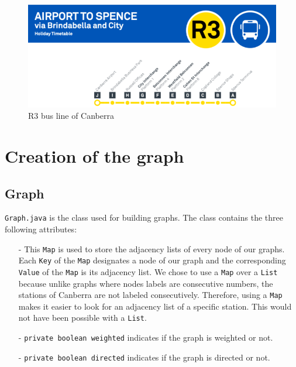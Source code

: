 \documentclass{article}
\begin{document}
\begin{figure}[h]
\begin{center}
	\includegraphics[scale=1]{assets/R3}
\end{center}
\caption{R3 bus line of Canberra}
\end{figure} 

\section{Creation of the graph}

\subsection{Graph}

\texttt{Graph.java} is the class used for building graphs.
The class contains the three following attributes:

\begin{itemize}
\item[-] This \texttt{Map} is used to store the adjacency lists of every node of our graphs. Each \texttt{Key} of the \texttt{Map} designates a node of our graph and the corresponding \texttt{Value} of the \texttt{Map} is its adjacency list. We chose to use a \texttt{Map} over a \texttt{List} because unlike graphs where nodes labels are consecutive numbers, the stations of Canberra are not labeled consecutively. Therefore, using a \texttt{Map} makes it easier to look for an adjacency list of a specific station. This would not have been possible with a \texttt{List}. 
\item[-]\texttt{private boolean weighted} indicates if the graph is weighted or not.
\item[-]\texttt{private boolean directed} indicates if the graph is directed or not.
\end{itemize}
\end{document}
